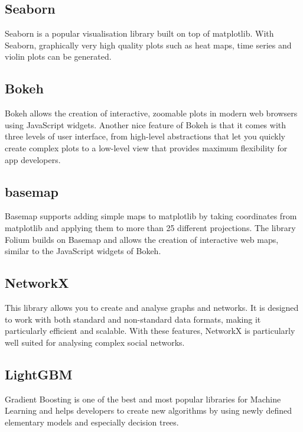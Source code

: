 \subsection{Seaborn}

Seaborn is a popular visualisation library built on top of matplotlib. With Seaborn, graphically very high quality plots such as heat maps, time series and violin plots can be generated.

\subsection{Bokeh}

Bokeh allows the creation of interactive, zoomable plots in modern web browsers using JavaScript widgets. Another nice feature of Bokeh is that it comes with three levels of user interface, from high-level abstractions that let you quickly create complex plots to a low-level view that provides maximum flexibility for app developers.

\subsection{basemap}

Basemap supports adding simple maps to matplotlib by taking coordinates from matplotlib and applying them to more than 25 different projections. The library Folium builds on Basemap and allows the creation of interactive web maps, similar to the JavaScript widgets of Bokeh.

\subsection{NetworkX}

This library allows you to create and analyse graphs and networks. It is designed to work with both standard and non-standard data formats, making it particularly efficient and scalable. With these features, NetworkX is particularly well suited for analysing complex social networks.

\subsection{LightGBM}

Gradient Boosting is one of the best and most popular libraries for Machine Learning and helps developers to create new algorithms by using newly defined elementary models and especially decision trees.

